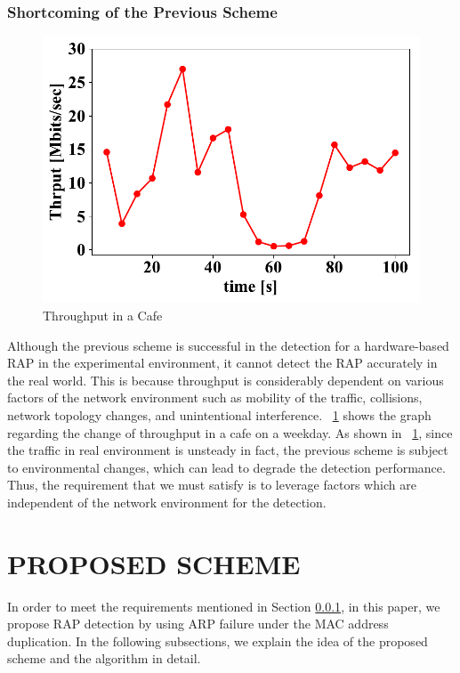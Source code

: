 \documentclass[conference]{IEEEtran}
\begin{document}
\subsubsection{Shortcoming of the Previous Scheme}\label{sec:shortcoming}
\begin{figure}[t]
    \begin{center}
        \includegraphics[scale=0.3]{figure/Thrput.pdf}
        \caption{Throughput in a Cafe}
        \label{thrput}
    \end{center}
    \vspace{-2zh}
\end{figure}
Although the previous scheme is successful in the detection for a hardware-based RAP in the experimental environment, it cannot detect the RAP accurately in the real world.
This is because throughput is considerably dependent on various factors of the network environment such as mobility of the traffic, collisions, network topology changes, and unintentional interference.
\figurename~\ref{thrput} shows the graph regarding the change of throughput in a cafe on a weekday.
As shown in \figurename~\ref{thrput}, since the traffic in real environment is unsteady in fact, the previous scheme is subject to environmental changes, which can lead to degrade the detection performance.
Thus, the requirement that we must satisfy is to leverage factors which are independent of the network environment for the detection.

\section{PROPOSED SCHEME}\label{sec:4}
In order to meet the requirements mentioned in Section \ref{sec:shortcoming}, in this paper, we propose RAP detection by using ARP failure under the MAC address duplication.
In the following subsections, we explain the idea of the proposed scheme and the algorithm in detail.
\end{document}
